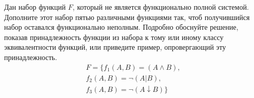 \question
Дан набор функций $F$, который не является функционально полной системой. Дополните этот набор пятью различными функциями так, чтоб получившийся набор оставался функционально неполным. Подробно обоснуйте решение, показав  принадлежность функции из набора к тому или иному классу эквивалентности функций, или приведите пример, опровергающий эту принадлежность. 
\begin{gather*}
F = \{f_1(A,B) = (A \land B), \\
f_2(A,B) = \neg(A | B), \\
f_3(A,B) = \neg(A \downarrow B)\}
\end{gather*}
